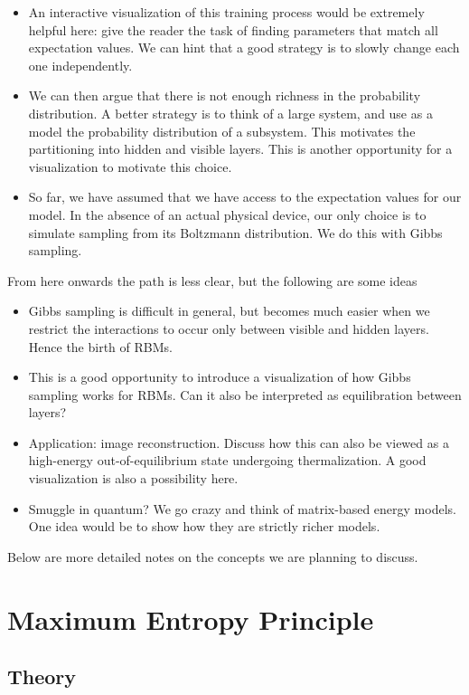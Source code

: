 \documentclass[nofootinbib, superscriptaddress, prl]{revtex4}
\begin{document}
\begin{itemize}
\item An interactive visualization of this training process would be extremely helpful here: give the reader the task of finding parameters that match all expectation values. We can hint that a good strategy is to slowly change each one independently.
\item We can then argue that there is not enough richness in the probability distribution. A better strategy is to think of a large system, and use as a model the probability distribution of a subsystem. This motivates the partitioning into hidden and visible layers. This is another opportunity for a visualization to motivate this choice.
\item So far, we have assumed that we have access to the expectation values for our model. In the absence of an actual physical device, our only choice is to simulate sampling from its Boltzmann distribution. We do this with Gibbs sampling.
\end{itemize}

From here onwards the path is less clear, but the following are some ideas
\begin{itemize}
\item Gibbs sampling is difficult in general, but becomes much easier when we restrict the interactions to occur only between visible and hidden layers. Hence the birth of RBMs.
\item This is a good opportunity to introduce a visualization of how Gibbs sampling works for RBMs. Can it also be interpreted as equilibration between layers?
\item Application: image reconstruction. Discuss how this can also be viewed as a high-energy out-of-equilibrium state undergoing thermalization. A good visualization is also a possibility here.
\item Smuggle in quantum? We go crazy and think of matrix-based energy models. One idea would be to show how they are strictly richer models.
\end{itemize}

Below are more detailed notes on the concepts we are planning to discuss.




\section{Maximum Entropy Principle}

\subsection{Theory}
\end{document}
